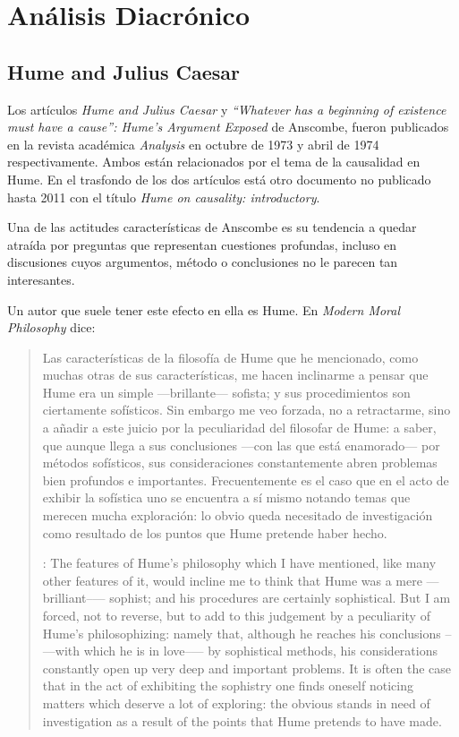 \section{Análisis Diacrónico}

\subsection{Hume and Julius Caesar}

Los artículos \emph{Hume and Julius Caesar} y \emph{``Whatever has a beginning
  of existence must have a cause'': Hume’s Argument Exposed} de Anscombe, fueron
publicados en la revista académica \emph{Analysis} en octubre de 1973 y abril de
1974 respectivamente. Ambos están relacionados por el tema de la causalidad en
Hume. En el trasfondo de los dos artículos está otro documento no publicado
hasta 2011 con el título \emph{Hume on causality: introductory}.

Una de las actitudes características de Anscombe es su tendencia a quedar
atraída por preguntas que representan cuestiones profundas, incluso en
discusiones cuyos argumentos, método o conclusiones no le parecen tan
interesantes.

Un autor que suele tener este efecto en ella es Hume. En \emph{Modern Moral
  Philosophy} dice:

\blockquote[{\cite[172]{anscombe1981mmph}}: The features of Hume’s philosophy
which I have mentioned, like many other features of it, would incline me to
think that Hume was a mere ---brilliant--— sophist; and his procedures are
certainly sophistical. But I am forced, not to reverse, but to add to this
judgement by a peculiarity of Hume’s philosophizing: namely that, although he
reaches his conclusions --—with which he is in love--— by sophistical methods,
his considerations constantly open up very deep and important problems. It is
often the case that in the act of exhibiting the sophistry one finds oneself
noticing matters which deserve a lot of exploring: the obvious stands in need of
investigation as a result of the points that Hume pretends to have made.]{Las
  características de la filosofía de Hume que he mencionado, como muchas otras
  de sus características, me hacen inclinarme a pensar que Hume era un simple
  ---brillante--- sofista; y sus procedimientos son ciertamente sofísticos. Sin
  embargo me veo forzada, no a retractarme, sino a añadir a este juicio por la
  peculiaridad del filosofar de Hume: a saber, que aunque llega a sus
  conclusiones ---con las que está enamorado--- por métodos sofísticos, sus
  consideraciones constantemente abren problemas bien profundos e importantes.
  Frecuentemente es el caso que en el acto de exhibir la sofística uno se
  encuentra a sí mismo notando temas que merecen mucha exploración: lo obvio
  queda necesitado de investigación como resultado de los puntos que Hume
  pretende haber hecho.}

